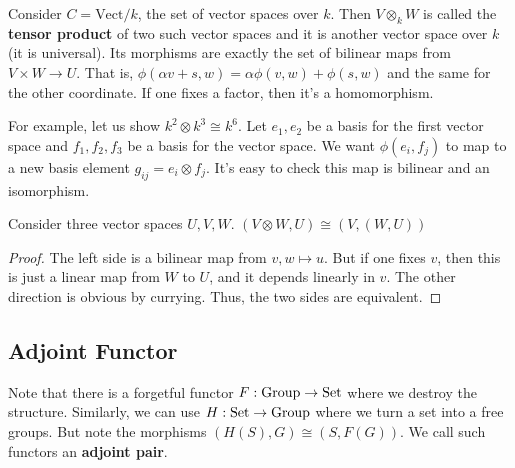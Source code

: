 \begin{definition}
    Consider $C = \text{Vect}/k$, the set of vector spaces over $k$.
    Then $V \otimes_k W$ is called the \textbf{tensor product} of two such vector spaces
    and it is another vector space over $k$ (it is universal). Its morphisms are exactly
    the set of bilinear maps from $V \times W \to U$. That is, $\phi(\alpha v + s, w) = \alpha \phi(v, w) + \phi(s, w)$
    and the same for the other coordinate. If one fixes a factor, then it's a homomorphism.
\end{definition}

For example, let us show $k^2 \otimes k^3 \cong k^6$. Let $e_1, e_2$ be a basis for the first vector space
and $f_1, f_2, f_3$ be a basis for the vector space. We want $\phi(e_i, f_j)$ to map to a new basis element $g_{ij} = e_i \otimes f_j$.
It's easy to check this map is bilinear and an isomorphism.

\begin{theorem}
    Consider three vector spaces $U, V, W$.
    $(V \otimes W, U) \cong (V, (W, U))$

    \begin{proof}
        The left side is a bilinear map from $v, w \mapsto u$. But if one fixes $v$,
        then this is just a linear map from $W$ to $U$, and it depends linearly in $v$.
        The other direction is obvious by currying. Thus, the two sides are equivalent.
    \end{proof}
\end{theorem}

\subsection{Adjoint Functor}
Note that there is a forgetful functor $F: \operatorname{Group} \to \operatorname{Set}$ where we destroy the structure.
Similarly, we can use $H: \operatorname{Set} \to \operatorname{Group}$ where we turn a set into a free groups.
But note the morphisms $(H(S), G) \cong (S, F(G))$. We call such functors an \textbf{adjoint pair}.